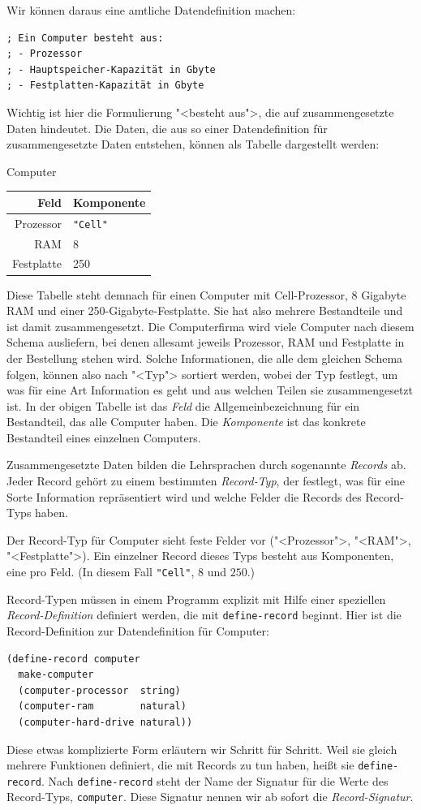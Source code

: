 Wir können daraus eine amtliche Datendefinition machen:
%
\begin{lstlisting}
; Ein Computer besteht aus:
; - Prozessor
; - Hauptspeicher-Kapazität in Gbyte
; - Festplatten-Kapazität in Gbyte
\end{lstlisting}
%
Wichtig ist hier die Formulierung "<besteht aus">, die auf
zusammengesetzte Daten hindeutet.  Die Daten, die aus so einer
Datendefinition für zusammengesetzte Daten entstehen, können als
Tabelle dargestellt werden:
%
\begin{center}
  Computer\qquad
  \begin{tabular}[c]{r|l}
    \textbf{Feld} & \textbf{Komponente}\\\hline
     Prozessor & \verb|"Cell"|\\
     RAM & 8\\
    Festplatte & 250
  \end{tabular}
\end{center}
%
Diese Tabelle steht demnach für einen Computer mit Cell-Prozessor, 8
Gigabyte RAM und einer 250-Gigabyte-Festplatte.  Sie hat also mehrere
Bestandteile und ist damit zusammengesetzt.  Die Computerfirma wird
viele Computer nach diesem Schema ausliefern, bei denen allesamt
jeweils Prozessor, RAM und Festplatte in der Bestellung stehen wird.  Solche
Informationen, die alle dem gleichen Schema folgen, können also nach
"<Typ"> sortiert werden, wobei der Typ
festlegt, um was für eine Art Information es geht und aus welchen
Teilen sie zusammengesetzt ist.  In der obigen Tabelle ist das
\textit{Feld} die Allgemeinbezeichnung für ein Bestandteil, das
alle Computer haben.  Die \textit{Komponente} ist das konkrete
Bestandteil eines einzelnen Computers.

Zusammengesetzte Daten bilden die Lehrsprachen durch
sogenannte \textit{Records} ab.  Jeder Record gehört
zu einem bestimmten
\textit{Record-Typ}, der festlegt, was für eine
Sorte Information repräsentiert wird und welche Felder die Records
des Record-Typs haben.

Der Record-Typ für Computer sieht feste Felder
vor ("<Prozessor">, "<RAM">, "<Festplatte">).  Ein einzelner Record
dieses Typs besteht aus Komponenten, eine pro
Feld. (In diesem Fall \lstinline{"Cell"}, $8$ und $250$.)

Record-Typen müssen in einem Programm explizit mit Hilfe einer
speziellen \textit{Record-Definition} definiert werden, die mit
\lstinline{define-record} beginnt.  Hier ist die
Record-Definition zur Datendefinition für
Computer:
%
\begin{lstlisting}
(define-record computer
  make-computer
  (computer-processor  string)
  (computer-ram        natural)
  (computer-hard-drive natural))
\end{lstlisting}
%
Diese etwas komplizierte Form erläutern wir Schritt für Schritt.  Weil sie gleich mehrere
Funktionen definiert, die mit Records zu tun haben, heißt
sie \lstinline{define-record}.  Nach
\lstinline{define-record} steht der Name der Signatur für
die Werte des Record-Typs,
\lstinline{computer}.  Diese Signatur nennen wir ab sofort die
\textit{Record-Signatur}.

